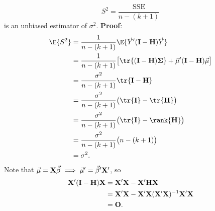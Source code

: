 \begin{Theorem}{}{}
    \[ S^2=\frac{\text{SSE}}{n-(k+1)} \]
    is an unbiased estimator of $ \sigma^2 $.
    \tcblower{}
    \textbf{Proof}:
    \begin{align*}
        \E{S^2}
         & =\frac{1}{n-(k+1)}\E{\Vector{Y}'(\Matrix{I}-\Matrix{H})\Vector{Y}}                                                         \\
         & =\frac{1}{n-(k+1)}\bigl[\tr{(\Matrix{I}-\Matrix{H})\Matrix{\Sigma}}+\Vector{\mu}'(\Matrix{I}-\Matrix{H})\Vector{\mu}\bigr] \\
         & =\frac{\sigma^2}{n-(k+1)}\tr{\Matrix{I}-\Matrix{H}}                                                                        \\
         & =\frac{\sigma^2}{n-(k+1)}\bigl(\tr{\Matrix{I}}-\tr{\Matrix{H}}\bigr)                                                       \\
         & =\frac{\sigma^2}{n-(k+1)}\bigl(\tr{\Matrix{I}}-\rank{\Matrix{H}}\bigr)                                                     \\
         & =\frac{\sigma^2}{n-(k+1)}\bigl(n-(k+1)\bigr)                                                                               \\
         & =\sigma^2.
    \end{align*}
    Note that $ \vec{\mu}=\mathbf{X}\vec{\beta}\implies \vec{\mu}'=\vec{\beta}'\mathbf{X}' $, so
    \begin{align*}
        \mathbf{X}'(\mathbf{I}-\mathbf{H})\mathbf{X}
         & =\mathbf{X}'\mathbf{X}-\mathbf{X}'\mathbf{H}\mathbf{X}                                        \\
         & =\mathbf{X}'\mathbf{X}-\mathbf{X}'\mathbf{X}(\mathbf{X}'\mathbf{X})^{-1}\mathbf{X}'\mathbf{X} \\
         & =\mathbf{O}.
    \end{align*}
\end{Theorem}
